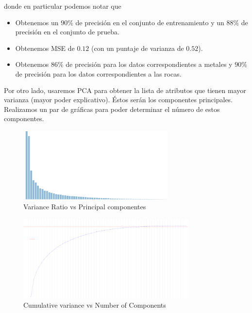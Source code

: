 \documentclass[letterpaper,11pt]{article}
\begin{document}
\begin{enumerate}
    donde en particular podemos notar que 
    \begin{itemize}
        \item Obtenemos un $90\%$ de precisión en el conjunto de entrenamiento 
        y un $88\%$ de precisión en el conjunto de prueba.

        \item Obtenemos MSE de $0.12$ (con un puntaje de varianza de $0.52$).

        \item Obtenemos $86\%$ de precisión para los datos correspondientes a 
        metales y $90\%$ de precisión para los datos correspondientes a las 
        rocas.
    \end{itemize}
    
    Por otro lado, usaremos PCA para obtener la lista de atributos que tienen 
    mayor varianza (mayor poder explicativo). Éstos serán los componentes 
    principales. Realizamos un par de gráficas para poder determinar el 
    número de estos componentes.
    \begin{figure}[ht]
        \centering
        \includegraphics[width=0.7\textwidth]{imagenes/sonar-pca1.png}
        \caption{Variance Ratio vs Principal componentes }
    \end{figure}
    \begin{figure}[ht]
        \centering
        \includegraphics[width=0.8\textwidth]{imagenes/sonar-pca2.png}
        \caption{Cumulative variance vs Number of Components}
    \end{figure}



\end{enumerate}
\end{document}
